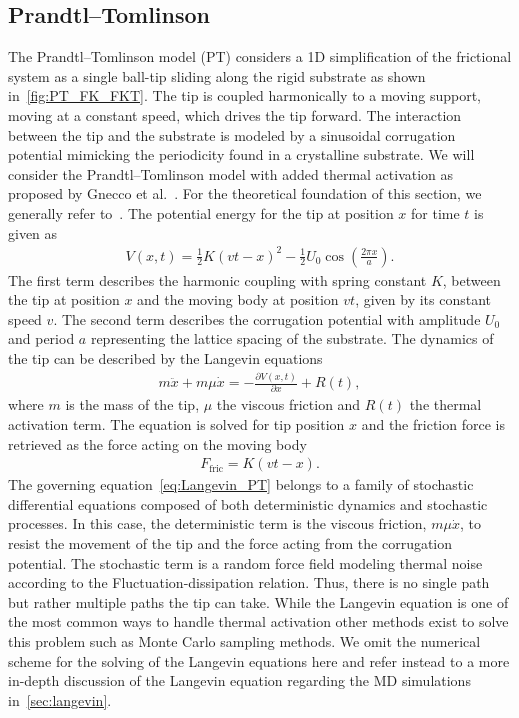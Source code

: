 \subsection{Prandtl–Tomlinson} %
The Prandtl–Tomlinson model (\acrshort{PT}) considers a 1D simplification of
the frictional system as a single ball-tip sliding along the rigid substrate as
shown in~\cref{fig:PT_FK_FKT}. The tip is coupled harmonically to a moving support, moving at a constant speed, which drives the tip forward. The interaction between
the tip and the substrate is modeled by a sinusoidal corrugation potential
mimicking the periodicity found in a crystalline substrate. We will consider the
Prandtl–Tomlinson model with added thermal activation as proposed by Gnecco et
al.~\cite{PhysRevLett.84.1172}. For the theoretical foundation of this section,
we generally refer to~\cite{Yalin_2011}. The potential energy for the tip at position $x$ for time $t$ is given as
\begin{align}
  V(x,t) = \frac{1}{2}K(vt - x)^2 - \frac{1}{2}U_0 \cos \left(\frac{2\pi x}{a} \right).
  \label{eq:V_PT}
\end{align}
The first term describes the harmonic coupling with spring constant $K$, between the tip at position $x$ and the moving body at position $vt$, given by its constant speed $v$. The second term describes the corrugation potential with amplitude $U_0$ and period $a$ representing the lattice spacing of the substrate. The dynamics of the tip can be described by the Langevin equations 
\begin{align}
  m \ddot{x}+m \mu \dot{x}=-\frac{\partial V(x, t)}{\partial x}+R(t),
  \label{eq:Langevin_PT}
\end{align}
where $m$ is the mass of the tip, $\mu$ the viscous friction and $R(t)$ the thermal activation term. The equation is solved for tip position $x$ and the friction force is retrieved as the force acting on the moving body
\begin{align*}
  F_{\text{fric}} = K(vt - x).
\end{align*}
The governing equation~\cref{eq:Langevin_PT} belongs to a family of stochastic differential equations composed of both deterministic dynamics and stochastic processes. In this case, the deterministic term is the viscous friction, $m\mu\dot{x}$, to resist the movement of the tip and the force acting from the corrugation potential. The stochastic term is a random force field modeling thermal noise according to the Fluctuation-dissipation relation. Thus, there is no single path but rather multiple paths the tip can take. While the Langevin equation is one of the most common ways to handle thermal activation other methods exist to solve this problem such as Monte Carlo sampling methods. We omit the numerical scheme for the solving of the Langevin equations here and refer instead to a more in-depth discussion of the Langevin equation regarding the \acrshort{MD} simulations in~\cref{sec:langevin}. 


